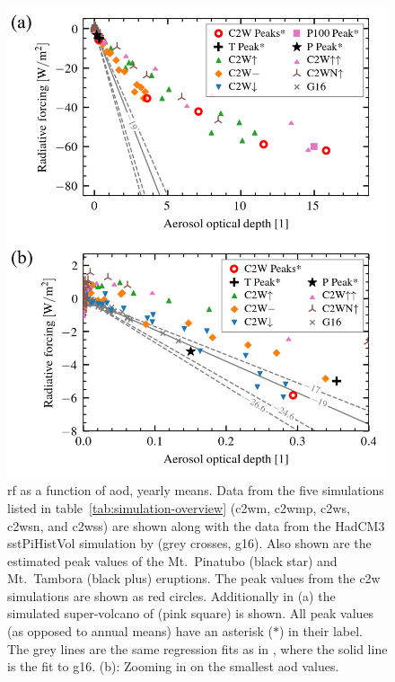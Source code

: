 \documentclass{ametsocV6.1}
\begin{document}
\begin{figure}
  \centering
  \includegraphics[width=0.5\linewidth]{figures/figure2.png}

  \caption{\gls{rf} as a function of \gls{aod}, yearly means. Data from the five
    simulations listed in table~\ref{tab:simulation-overview} (\gls{c2wm}, \gls{c2wmp},
    \gls{c2ws}, \gls{c2wsn}, and \gls{c2wss}) are shown along with the data from the HadCM3
    sstPiHistVol simulation by \citet{gregory2016} (grey crosses, \gls{g16}). Also shown are
    the estimated peak values of the Mt.\ Pinatubo (black star) and Mt.\ Tambora (black
    plus) eruptions. The peak values from the \gls{c2w} simulations are shown as red
    circles. Additionally in (a) the simulated super-volcano of \citet{jones2005} (pink
    square) is shown. All peak values (as opposed to annual means) have an asterisk
    (\(\ast{}\)) in their label. The grey lines are the same regression fits as in
    \citet[][Fig.\ 4]{gregory2016}, where the solid line is the fit to \gls{g16}. (b):
    Zooming in on the smallest \gls{aod} values.}\label{fig:2_rf_vs_aod_slopes}%
\end{figure}
\end{document}
